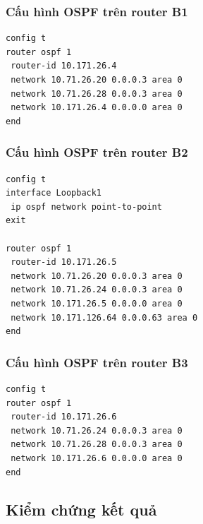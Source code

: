 
\subsubsection{Cấu hình OSPF trên router B1}

\begin{lstlisting}
config t
router ospf 1
 router-id 10.171.26.4
 network 10.71.26.20 0.0.0.3 area 0
 network 10.71.26.28 0.0.0.3 area 0
 network 10.171.26.4 0.0.0.0 area 0
end
\end{lstlisting}


\subsubsection{Cấu hình OSPF trên router B2}


\begin{lstlisting}
config t
interface Loopback1
 ip ospf network point-to-point
exit

router ospf 1
 router-id 10.171.26.5
 network 10.71.26.20 0.0.0.3 area 0
 network 10.71.26.24 0.0.0.3 area 0
 network 10.171.26.5 0.0.0.0 area 0
 network 10.171.126.64 0.0.0.63 area 0
end
\end{lstlisting}


\subsubsection{Cấu hình OSPF trên router B3}


\begin{lstlisting}
config t
router ospf 1
 router-id 10.171.26.6
 network 10.71.26.24 0.0.0.3 area 0
 network 10.71.26.28 0.0.0.3 area 0
 network 10.171.26.6 0.0.0.0 area 0
end
\end{lstlisting}




\subsection{Kiểm chứng kết quả}

